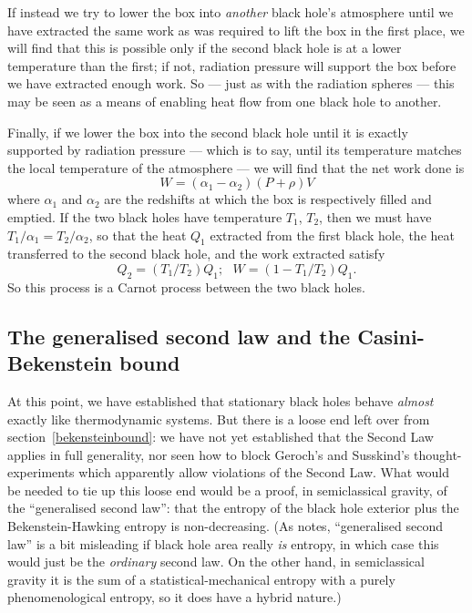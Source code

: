 \documentclass[12pt]{article}
\newcommand{\be}{\begin{equation}}
\newcommand{\ee}{\end{equation}}
\begin{document}
If instead we try to lower the box into \emph{another} black hole's atmosphere until we have extracted the same work as was required to lift the box in the first place, we will find that this is possible only if the second black hole is at a lower temperature than the first; if not, radiation pressure will support the box before we have extracted enough work. So --- just as with the radiation spheres --- this may be seen as a means of enabling heat flow from one black hole to another. 

Finally, if we lower the box into the second black hole until it is exactly supported by radiation pressure --- which is to say, until its temperature matches the local temperature of the atmosphere --- we will find that the net work done is 
\be
W = (\alpha_1 - \alpha_2)(P+\rho)V
\ee
where $\alpha_1$ and $\alpha_2$ are the redshifts at which the box is respectively filled and emptied. If the two black holes have temperature $T_1$, $T_2$, then we must have $T_1/\alpha_1=T_2/\alpha_2$, so that the heat $Q_1$ extracted from the first black hole, the heat transferred to the second black hole, and the work extracted satisfy
\be
Q_2 = (T_1/T_2) Q_1;\,\,\,\, W = (1-T_1/T_2) Q_1.
\ee
So this process is a Carnot process between the two black holes.

\subsection{The generalised second law and the Casini-Bekenstein bound}

At this point, we have established that stationary black holes behave \emph{almost} exactly like thermodynamic systems. But there is a loose end left over from section~\ref{bekensteinbound}: we have not yet established that the Second Law applies in full generality, nor seen how to block Geroch's and Susskind's thought-experiments which apparently allow violations of the Second Law. What would be needed to tie up this loose end would be a proof, in semiclassical gravity, of the ``generalised second law'': that the entropy of the black hole exterior plus the Bekenstein-Hawking entropy is non-decreasing. (As   notes, ``generalised second law'' is a bit misleading if black hole area really \emph{is} entropy, in which case this would just be the \emph{ordinary} second law. On the other hand, in semiclassical gravity it is the sum of a statistical-mechanical entropy with a purely phenomenological entropy, so it does have a hybrid nature.)
\end{document}
